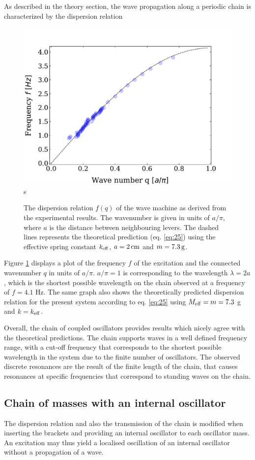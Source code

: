 \documentclass[12pt]{article}
\begin{document}
As described in the theory section, the wave propagation along a periodic chain is characterized by the dispersion relation


\begin{figure}[hbt]
  \includegraphics[width=0.5\columnwidth]{dispersion_simple_chain.pdf}s
  \caption{The dispersion relation $f(q)$ of the wave machine as derived from the experimental results. The wavenumber is given in units of $a/\pi$, where $a$ is the distance between neighbouring levers. The dashed lines represents the theoretical prediction (eq. \ref{eq:25}) using the effective spring constant $k_{\rm eff}$, $a=2\,{\rm cm}$ and $m=7.3\, {\rm g}$.}\label{fig:figure18}
\end{figure}
 
 Figure \ref{fig:figure18} displays a plot of the frequency $f$ of the excitation and the connected wavenumber $q$ in units of $a/\pi$. $a/\pi=1$ is corresponding to the wavelength $\lambda=2a$, which is the shortest possible wavelength on the chain observed at a frequency of $f=4.1$ Hz. The same graph also shows the theoretically predicted dispersion relation for the present system according to eq. \ref{eq:25} using $M_{\rm eff}=m=7.3$ g and $k=k_{\rm eff}$. 
 
 Overall, the chain of coupled oscillators provides results which nicely agree with the theoretical predictions. The chain supports waves in a well defined frequency range, with a cut-off frequency that corresponds to the shortest possible wavelength in the system due to the finite number of oscillators. The observed discrete resonances are the result of the finite length of the chain, that causes resonances at specific frequencies that correspond to standing waves on the chain.
 
\subsection{Chain of masses with an internal oscillator}
The dispersion relation and also the transmission of the chain is modified when inserting the brackets and providing an internal oscillator to each oscillator mass. An excitation may thus yield a localised oscillation of an internal oscillator without a propagation of a wave.
\end{document}
